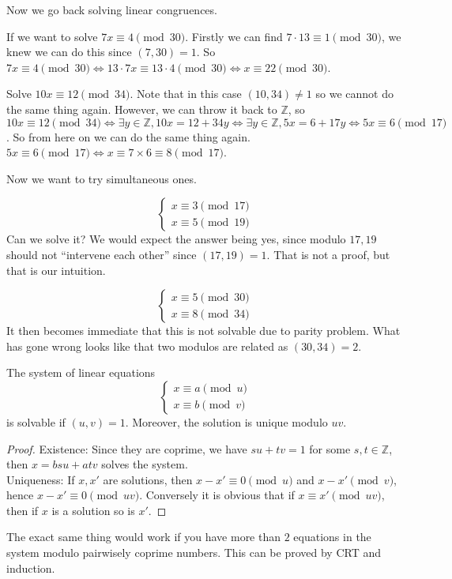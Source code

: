 Now we go back solving linear congruences.
\begin{example}
    If we want to solve $7x\equiv 4\pmod{30}$.
    Firstly we can find $7\cdot 13\equiv 1\pmod{30}$, we knew we can do this since $(7,30)=1$.
    So $7x\equiv 4\pmod{30}\iff 13\cdot 7x\equiv 13\cdot 4\pmod{30}\iff x\equiv 22\pmod{30}$.
\end{example}
\begin{example}
    Solve $10x\equiv 12\pmod{34}$.
    Note that in this case $(10,34)\neq 1$ so we cannot do the same thing again.
    However, we can throw it back to $\mathbb Z$, so $10x\equiv 12\pmod{34}\iff\exists y\in\mathbb Z, 10x=12+34y\iff\exists y\in\mathbb Z,5x=6+17y\iff 5x\equiv 6\pmod{17}$.
    So from here on we can do the same thing again.
    $5x\equiv 6\pmod{17}\iff x\equiv 7\times 6\equiv 8\pmod{17}$.
\end{example}
Now we want to try simultaneous ones.
\begin{example}
    \[
        \begin{cases}
            x\equiv 3\pmod{17}\\
            x\equiv 5\pmod{19}
        \end{cases}
    \]
    Can we solve it?
    We would expect the answer being yes, since modulo $17,19$ should not ``intervene each other'' since $(17,19)=1$.
    That is not a proof, but that is our intuition.
\end{example}
\begin{example}
    \[
        \begin{cases}
            x\equiv 5\pmod{30}\\
            x\equiv 8\pmod{34}
        \end{cases}
    \]
    It then becomes immediate that this is not solvable due to parity problem.
    What has gone wrong looks like that two modulos are related as $(30,34)=2$.
\end{example}
\begin{theorem}
    The system of linear equations
    \[
        \begin{cases}
            x\equiv a\pmod{u}\\
            x\equiv b\pmod{v}
        \end{cases}
    \]
    is solvable if $(u,v)=1$.
    Moreover, the solution is unique modulo $uv$.
\end{theorem}
\begin{proof}
    Existence: Since they are coprime, we have $su+tv=1$ for some $s,t\in\mathbb Z$, then $x=bsu+atv$ solves the system.\\
    Uniqueness: If $x,x'$ are solutions, then $x-x'\equiv 0\pmod{u}$ and $x-x'\pmod{v}$, hence $x-x'\equiv 0\pmod{uv}$.
    Conversely it is obvious that if $x\equiv x'\pmod{uv}$, then if $x$ is a solution so is $x'$.
\end{proof}
The exact same thing would work if you have more than $2$ equations in the system modulo pairwisely coprime numbers.
This can be proved by CRT and induction.
